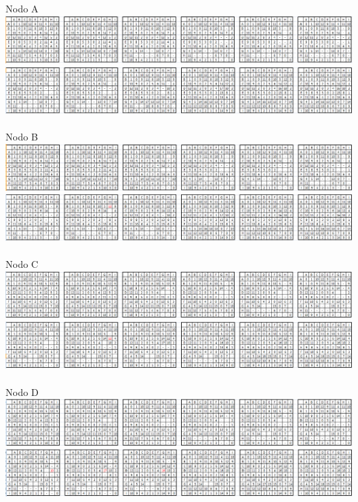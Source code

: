 \documentclass[paper=a4, fontsize=11pt]{scrartcl}
\numberwithin{equation}{section}		%
\numberwithin{figure}{section}			%
\numberwithin{table}{section}				%
\begin{document}
Nodo A
\includegraphics[width=1\textwidth]{3a1.png}\\
\includegraphics[width=1\textwidth]{3a2.png}\\\\
Nodo B
\includegraphics[width=1\textwidth]{3b1.png}\\
\includegraphics[width=1\textwidth]{3b2.png}\\\\
Nodo C
\includegraphics[width=1\textwidth]{3c1.png}\\
\includegraphics[width=1\textwidth]{3c2.png}\\\\
Nodo D
\includegraphics[width=1\textwidth]{3d1.png}\\
\includegraphics[width=1\textwidth]{3d2.png}\\\\
\end{document}
